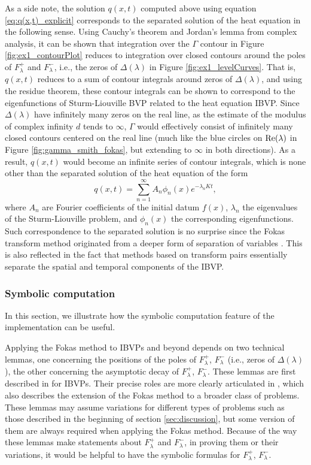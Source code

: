 \documentclass[12pt, oneside, a4paper]{article}
\begin{document}
As a side note, the solution $q(x,t)$ computed above using equation \eqref{eq:q(x,t)_explicit} corresponds to the separated solution of the heat equation \cite{Pinsky1991} in the following sense. Using Cauchy's theorem and Jordan's lemma from complex analysis, it can be shown that integration over the $\Gamma$ contour in Figure \ref{fig:ex1_contourPlot} reduces to integration over closed contours around the poles of $F^+_\lambda$ and $F^-_\lambda$, i.e., the zeros of $\Delta(\lambda)$ in Figure \ref{fig:ex1_levelCurves}. That is, $q(x,t)$ reduces to a sum of contour integrals around zeros of $\Delta(\lambda)$, and using the residue theorem, these contour integrals can be shown to correspond to the eigenfunctions of Sturm-Liouville BVP related to the heat equation IBVP. Since $\Delta(\lambda)$ have infinitely many zeros on the real line, as the estimate of the modulus of complex infinity $d$ tends to $\infty$, $\Gamma$ would effectively consist of infinitely many closed contours centered on the real line (much like the blue circles on $\mathrm{Re}(\lambda)$ in Figure \ref{fig:gamma_smith_fokas}, but extending to $\infty$ in both directions). As a result, $q(x,t)$ would become an infinite series of contour integrals, which is none other than the separated solution of the heat equation of the form 
\[q(x,t) = \sum_{n=1}^\infty A_n \phi_n(x)e^{-\lambda_n Kt},\]
where $A_n$ are Fourier coefficients of the initial datum $f(x)$, $\lambda_n$ the eigenvalues of the Sturm-Liouville problem, and $\phi_n(x)$ the corresponding eigenfunctions. Such correspondence to the separated solution is no surprise since the Fokas transform method originated from a deeper form of separation of variables \cite{Fokas1997}\cite{Fokas2009}. This is also reflected in the fact that methods based on transform pairs essentially separate the spatial and temporal components of the IBVP.

\subsubsection{Symbolic computation}\label{sec:symbolic_computation}

In this section, we illustrate how the symbolic computation feature of the implementation can be useful.

Applying the Fokas method to IBVPs and beyond depends on two technical lemmas, one concerning the positions of the poles of $F^+_\lambda$, $F^-_\lambda$ (i.e., zeros of $\Delta(\lambda)$), the other concerning the asymptotic decay of $F^+_\lambda$, $F^-_\lambda$. These lemmas are first described in \cite{Smith2012} for IBVPs. Their precise roles are more clearly articulated in \cite{Miller2018}, which also describes the extension of the Fokas method to a broader class of problems. These lemmas may assume variations for different types of problems such as those described in the beginning of section \ref{sec:discussion}, but some version of them are always required when applying the Fokas method. Because of the way these lemmas make statements about $F^+_\lambda$ and $F^-_\lambda$, in proving them or their variations, it would be helpful to have the symbolic formulas for $F^+_\lambda$, $F^-_\lambda$.
\end{document}
